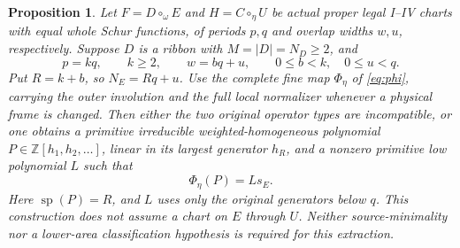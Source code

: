 \documentclass[11pt,a4paper]{amsart}
\numberwithin{equation}{section}
\theoremstyle{plain}
\newtheorem{proposition}[theorem]{Proposition}
\theoremstyle{definition}
\newcommand{\Z}{\mathbb Z}
\newcommand{\spn}{\operatorname{sp}}
\begin{document}
\begin{proposition}\label{prop:full-image}
Let \(F=D\circ_\omega E\) and \(H=C\circ_\eta U\) be actual proper legal
I--IV charts with equal whole Schur functions, of periods \(p,q\) and
overlap widths \(w,u\), respectively.  Suppose \(D\) is a ribbon with
\(M=|D|=N_D\ge2\), and
\[
 p=kq,\qquad k\ge2,\qquad w=bq+u,\qquad
 0\le b<k,\quad 0\le u<q.
\]
Put \(R=k+b\), so \(N_E=Rq+u\).  Use the complete fine map
\(\Phi_\eta\) of \eqref{eq:phi}, carrying the outer involution and the
full local normalizer whenever a physical frame is changed.
Then either the two original operator types are incompatible, or one
obtains a primitive irreducible weighted-homogeneous polynomial
\(P\in\Z[h_1,h_2,\ldots]\), linear in its largest generator \(h_R\), and
a nonzero primitive low polynomial \(L\) such that
\begin{equation}\label{eq:full-source-image}
 \Phi_\eta(P)=L s_E.
\end{equation}
Here \(\spn(P)=R\), and \(L\) uses only the original generators below \(q\).
This construction does not assume a chart on \(E\) through \(U\).
Neither source-minimality nor a lower-area classification hypothesis is
required for this extraction.
\end{proposition}
\end{document}
